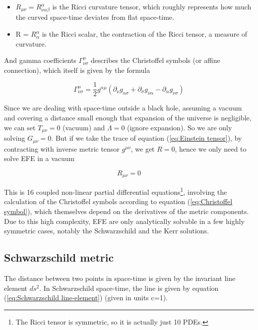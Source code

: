 \documentclass{article}
\begin{document}
\begin{itemize}
    \item $R_{\mu \nu} = R^{\alpha}_{\nu \alpha \beta}$ is the Ricci curvature tensor, which roughly represents how much the curved space-time deviates from flat space-time.
    \item R = $R^{\alpha}_{\alpha}$ is the Ricci scalar, the contraction of the Ricci tensor, a measure of curvature.
\end{itemize}

And gamma coefficients $\Gamma^{\mu}_{\nu \sigma}$ describes the Christoffel symbols (or affine connection), which itself is given by the formula

\begin{equation}
    \Gamma^{\mu}_{\nu \sigma} = \frac{1}{2} g^{\alpha \mu} (\partial_{\nu}g_{\alpha \sigma}+\partial_{\sigma} g_{\nu \alpha} - \partial_{\alpha} g_{\nu \sigma})
\label{eq:Christoffel symbol}
\end{equation}

Since we are dealing with space-time outside a black hole, assuming a vacuum and covering a distance small enough that expansion of the universe is negligible, we can set $T_{\mu \nu}=0$ (vacuum) and $\Lambda=0$ (ignore expansion). So we are only solving $G_{\mu \nu}=0$. But if we take the trace of equation (\ref{eq:Einstein tensor}), by contracting with inverse metric tensor $g^{\mu \nu}$, we get $R=0$, hence we only need to solve EFE in a vacuum

\begin{equation}
    R_{\mu \nu } = 0
\label{eq:EFE in a vacuum}
\end{equation}

This is 16 coupled non-linear partial differential equations\footnote{The Ricci tensor is symmetric, so it is actually just 10 PDEs.}, involving the calculation of the Christoffel symbols according to equation (\ref{eq:Christoffel symbol}), which themselves depend on the derivatives of the metric components. Due to this high complexity, EFE are only analytically solvable in a few highly symmetric cases, notably the Schwarzschild and the Kerr solutions.

\subsection{Schwarzschild metric}

The distance between two points in space-time is given by the invariant line element $ds^2$. In Schwarzschild space-time, the line is given by equation (\ref{eq:Schwarzschild line-element}) (given in units c=1).
\end{document}
